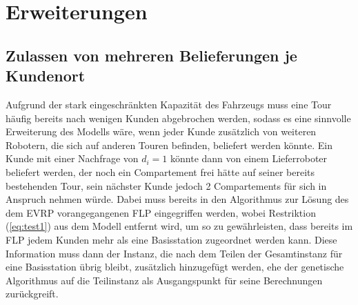 \documentclass[a4paper,12pt,parskip,bibtotoc,liststotoc]{article}
\begin{document}
\section{Erweiterungen}

\subsection{Zulassen von mehreren Belieferungen je Kundenort}

Aufgrund der stark eingeschränkten Kapazität des Fahrzeugs muss eine Tour häufig bereits nach wenigen Kunden abgebrochen werden, sodass es eine sinnvolle Erweiterung des Modells wäre, wenn jeder Kunde zusätzlich von weiteren Robotern, die sich auf anderen Touren befinden, beliefert werden könnte.
Ein Kunde mit einer Nachfrage von $d_{i} = 1$ könnte dann von einem Lieferroboter beliefert werden, der noch ein Compartement frei hätte auf seiner bereits bestehenden Tour, sein nächster Kunde jedoch 2 Compartements für sich in Anspruch nehmen würde.
Dabei muss bereits in den Algorithmus zur Lösung des dem EVRP vorangegangenen  FLP eingegriffen werden, wobei Restriktion (\ref{eq:test1}) aus dem Modell entfernt wird, um so zu gewährleisten, dass bereits im FLP jedem Kunden mehr als eine Basisstation zugeordnet werden kann.
Diese Information muss dann der Instanz, die nach dem Teilen der Gesamtinstanz für eine Basisstation übrig bleibt, zusätzlich hinzugefügt werden, ehe der genetische Algorithmus auf die Teilinstanz als Ausgangspunkt für seine Berechnungen zurückgreift.





%
%
%
%
%
\end{document}

